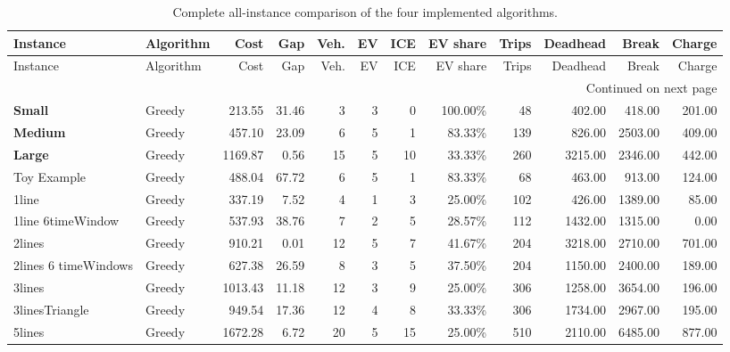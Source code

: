 \begin{landscape}
\begingroup
{}
\newcommand{\headlineinst}[1]{\textcolor{headlineBlue}{\textbf{#1}}}
\newcommand{\bestcell}[1]{\cellcolor{bestGreen}\textbf{#1}}
\fontsize{6.6}{7.6}\selectfont
\setlength{\tabcolsep}{3.0pt}
\renewcommand{\arraystretch}{0.82}
\setlength{\LTpre}{0pt}
\setlength{\LTpost}{0pt}
\begin{longtable}{llrrrrrrrrrr}
\caption{Complete all-instance comparison of the four implemented algorithms.}
\label{tab:appendix-complete-algo}\\
\toprule
Instance & Algorithm & Cost & Gap & Veh. & EV & ICE & EV share & Trips & Deadhead & Break & Charge\\
\midrule
\endfirsthead
\toprule
Instance & Algorithm & Cost & Gap & Veh. & EV & ICE & EV share & Trips & Deadhead & Break & Charge\\
\midrule
\endhead
\midrule
\multicolumn{12}{r}{Continued on next page}\\
\endfoot
\bottomrule
\endlastfoot
\headlineinst{Small} & Greedy & 213.55 & 31.46 & 3 & 3 & 0 & 100.00\% & 48 & 402.00 & 418.00 & 201.00\\
\headlineinst{Medium} & Greedy & 457.10 & 23.09 & 6 & 5 & 1 & 83.33\% & 139 & 826.00 & 2503.00 & 409.00\\
\headlineinst{Large} & Greedy & 1169.87 & 0.56 & 15 & 5 & 10 & 33.33\% & 260 & 3215.00 & 2346.00 & 442.00\\
Toy Example & Greedy & 488.04 & 67.72 & 6 & 5 & 1 & 83.33\% & 68 & 463.00 & 913.00 & 124.00\\
1line & Greedy & 337.19 & 7.52 & 4 & 1 & 3 & 25.00\% & 102 & 426.00 & 1389.00 & 85.00\\
1line 6timeWindow & Greedy & 537.93 & 38.76 & 7 & 2 & 5 & 28.57\% & 112 & 1432.00 & 1315.00 & 0.00\\
2lines & Greedy & 910.21 & 0.01 & 12 & 5 & 7 & 41.67\% & 204 & 3218.00 & 2710.00 & 701.00\\
2lines 6 timeWindows & Greedy & 627.38 & 26.59 & 8 & 3 & 5 & 37.50\% & 204 & 1150.00 & 2400.00 & 189.00\\
3lines & Greedy & 1013.43 & 11.18 & 12 & 3 & 9 & 25.00\% & 306 & 1258.00 & 3654.00 & 196.00\\
3linesTriangle & Greedy & 949.54 & 17.36 & 12 & 4 & 8 & 33.33\% & 306 & 1734.00 & 2967.00 & 195.00\\
5lines & Greedy & 1672.28 & 6.72 & 20 & 5 & 15 & 25.00\% & 510 & 2110.00 & 6485.00 & 877.00\\

\end{longtable}
\end{landscape}
